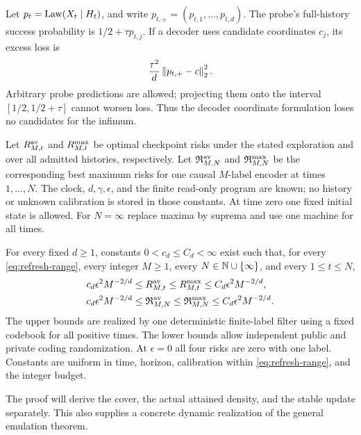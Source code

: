 Let $p_t=\operatorname{Law}(X_t\mid H_t)$, and write $p_{t,+}=(p_{t,1},\ldots,p_{t,d})$.
The probe's full-history success probability is $1/2+\tau p_{t,j}$.
If a decoder uses candidate coordinates $c_j$, its excess loss is
\begin{equation}\label{eq:refresh-distortion}
 \frac{\tau^2}{d}\left\lVert p_{t,+}-c\right\rVert_2^2.
\end{equation}
Arbitrary probe predictions are allowed; projecting them onto the interval
$[1/2,1/2+\tau]$ cannot worsen loss. Thus the decoder coordinate formulation
loses no candidates for the infimum.

Let $R_{M,t}^{\rm av}$ and $R_{M,t}^{\rm max}$ be optimal checkpoint risks
under the stated exploration and over all admitted histories, respectively.
Let $\mathfrak R_{M,N}^{\rm av}$ and $\mathfrak R_{M,N}^{\rm max}$ be the
corresponding best maximum risks for one causal $M$-label encoder at times
$1,\ldots,N$. The clock, $d,\gamma,\epsilon$, and the finite read-only
program are known; no history or unknown calibration is stored in those
constants. At time zero one fixed initial state is allowed. For $N=\infty$
replace maxima by suprema and use one machine for all times.

\begin{theorem}\label{thm:refresh}
For every fixed $d\ge1$, constants $0<c_d\le C_d<\infty$ exist such that,
for every \eqref{eq:refresh-range}, every integer $M\ge1$, every
$N\in\mathbb N\cup\{\infty\}$, and every $1\le t\le N$,
\begin{align}
 c_d\epsilon^2M^{-2/d}
 &\le R_{M,t}^{\rm av}\le R_{M,t}^{\rm max}
 \le C_d\epsilon^2M^{-2/d},\label{eq:refresh-checkpoint}\\
 c_d\epsilon^2M^{-2/d}
 &\le\mathfrak R_{M,N}^{\rm av}
 \le\mathfrak R_{M,N}^{\rm max}
 \le C_d\epsilon^2M^{-2/d}.
 \label{eq:refresh-causal}
\end{align}
The upper bounds are realized by one deterministic finite-label filter
using a fixed codebook for all positive times. The lower bounds allow
independent public and private coding randomization. At $\epsilon=0$ all
four risks are zero with one label. Constants are uniform in time, horizon,
calibration within \eqref{eq:refresh-range}, and the integer budget.
\end{theorem}

The proof will derive the cover, the actual attained density, and the
stable update separately. This also supplies a concrete dynamic realization
of the general emulation theorem.

